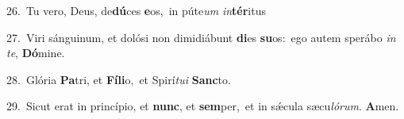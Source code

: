 {\numbfont\textcolor{\numbcolor}{26.}}~Tu vero, Deus, de\-\textbf{dú}\-ces \textbf{e}\-os,~\star in púte\textit{um} \textit{in}\-\textbf{tér}itus\par
{\numbfont\textcolor{\numbcolor}{27.}}~Viri sánguinum, et dolósi non dimidiábunt \textbf{di}\-es \textbf{su}\-os:~\star ego autem sperábo \textit{in} \textit{te}\-, \textbf{Dó}\-mine.\par
{\numbfont\textcolor{\numbcolor}{28.}}~Glória \textbf{Pa}\-tri, et \textbf{Fí}\-\textbf{li}o,~\star et Spirí\-\textit{tu}\-\textit{i} \textbf{Sanc}\-to.\par
{\numbfont\textcolor{\numbcolor}{29.}}~Sicut erat in princípio, et \textbf{nunc}\-, et \textbf{sem}\-per,~\star et in sǽcula sæcu\-\textit{ló}\-\textit{rum}. \textbf{A}\-men.\par
